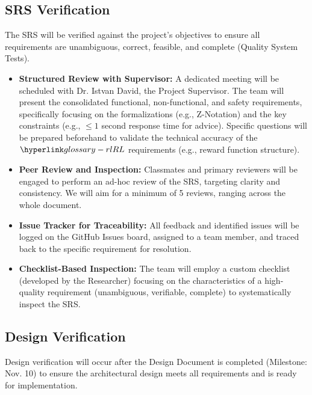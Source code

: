 \documentclass[12pt, titlepage]{article}
\begin{document}
\FloatBarrier


\subsection{SRS Verification}



The SRS will be verified against the project’s objectives to ensure all requirements are unambiguous, correct, feasible, and complete (Quality System Tests).

\begin{itemize}
    \item \textbf{Structured Review with Supervisor:} A dedicated meeting will be scheduled with Dr. Istvan David, the Project Supervisor.
    The team will present the consolidated functional, non-functional, and safety requirements, specifically focusing on the formalizations (e.g., Z-Notation) and the key constraints (e.g., $\leq 1$ second response time for advice).
    Specific questions will be prepared beforehand to validate the technical accuracy of the $\RL{}$ requirements (e.g., reward function structure).
    \item \textbf{Peer Review and Inspection:} Classmates and primary reviewers will be engaged to perform an ad-hoc review of the SRS, targeting clarity and consistency.
    We will aim for a minimum of 5 reviews, ranging across the whole document.
    \item \textbf{Issue Tracker for Traceability:} All feedback and identified issues will be logged on the GitHub Issues board, assigned to a team member, and traced back to the specific requirement for resolution.
    \item \textbf{Checklist-Based Inspection:} The team will employ a custom checklist (developed by the Researcher) focusing on the characteristics of a high-quality requirement (unambiguous, verifiable, complete) to systematically inspect the SRS.
\end{itemize}



\subsection{Design Verification}


Design verification will occur after the Design Document is completed (Milestone: Nov. 10) to ensure the architectural design meets all requirements and is ready for implementation.
\end{document}
